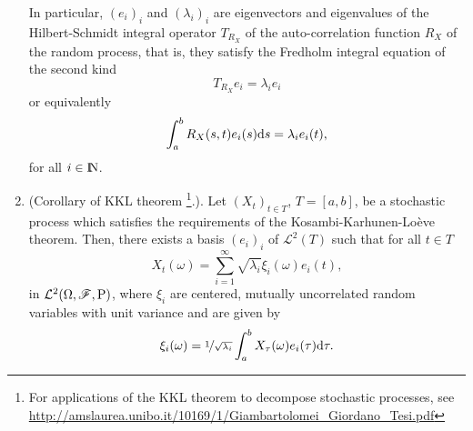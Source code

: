 \documentclass[a4paper,10pt]{article}
\begin{document}
\begin{enumerate}
       In particular, \((e_i)_i\) and \((\lambda_i)_i\) are eigenvectors and eigenvalues of the 
       Hilbert-Schmidt integral operator \(T_{R_X}\) of the auto-correlation function \(R_X\) of the 
       random process, that is, they satisfy the Fredholm integral equation of the second kind
       \[
        T_{R_X}e_i = \lambda_i e_i
       \]
       or equivalently
       \[
        \int_{a}^{b} R_X(s,t) e_i(s) \mathrm{d} s = \lambda_i e_i(t),
       \]
       for all $i\in\N$.
 \item (Corollary of KKL theorem%
	\footnote{For applications of the KKL theorem to decompose stochastic processes, see 
	\url{http://amslaurea.unibo.it/10169/1/Giambartolomei_Giordano_Tesi.pdf}}.). 
	Let \((X_t)_{t\in T}\), \(T=[a,b]\), be a stochastic process 
       which satisfies the requirements of the Kosambi-Karhunen-Lo{\`e}ve theorem. Then, there 
       exists a basis \((e_i)_i\) of \(\mathcal{L}^2(T)\) such that for all \(t\in T\)
       \[
        X_t(\omega) = \sum_{i=1}^{\infty} \sqrt{\lambda_i}\xi_i(\omega)e_i(t),
       \]
       in \(\mathcal{L}^2(\Omega,\mathscr{F},\mathrm{P})\), where \(\xi_i\) are centered, mutually uncorrelated random
       variables with unit variance and are given by
       \[
        \xi_i(\omega) = \nicefrac{1}{\sqrt{\lambda_i}}\int_{a}^{b} X_{\tau}(\omega) e_i(\tau) \mathrm{d} \tau.
       \]
\end{enumerate}
\end{document}
